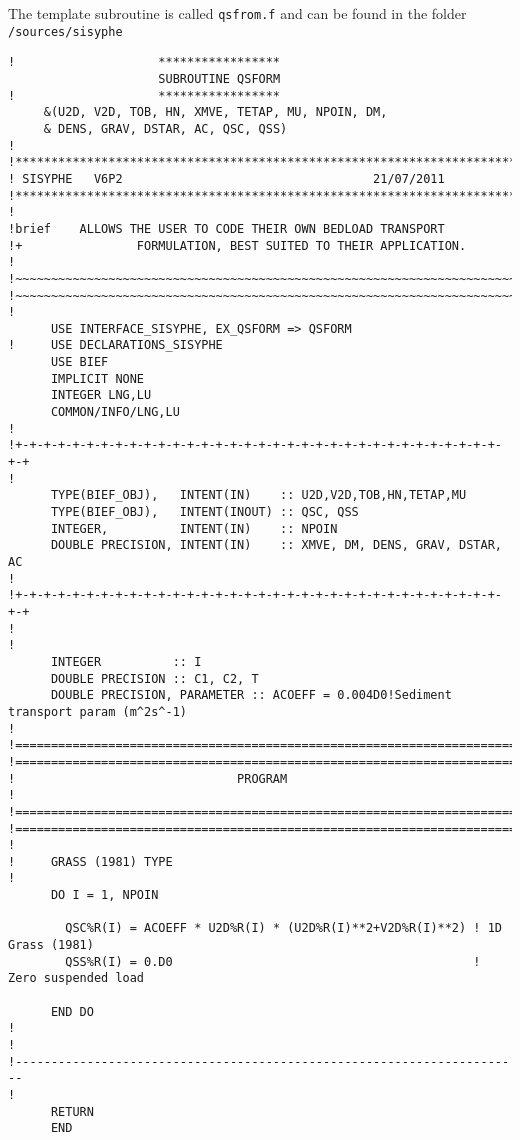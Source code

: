 The template subroutine is called \texttt{qsfrom.f} and can be found in the folder \texttt{/sources/sisyphe}
\begin{lstlisting}[frame=trBL]
!                    ***************** 
                     SUBROUTINE QSFORM 
!                    ***************** 
     &(U2D, V2D, TOB, HN, XMVE, TETAP, MU, NPOIN, DM,  
     & DENS, GRAV, DSTAR, AC, QSC, QSS) 
! 
!***********************************************************************
! SISYPHE   V6P2                                   21/07/2011 
!***********************************************************************
! 
!brief    ALLOWS THE USER TO CODE THEIR OWN BEDLOAD TRANSPORT 
!+                FORMULATION, BEST SUITED TO THEIR APPLICATION. 
! 
!~~~~~~~~~~~~~~~~~~~~~~~~~~~~~~~~~~~~~~~~~~~~~~~~~~~~~~~~~~~~~~~~~~~~~~~
!~~~~~~~~~~~~~~~~~~~~~~~~~~~~~~~~~~~~~~~~~~~~~~~~~~~~~~~~~~~~~~~~~~~~~~~
! 
      USE INTERFACE_SISYPHE, EX_QSFORM => QSFORM 
!     USE DECLARATIONS_SISYPHE 
      USE BIEF 
      IMPLICIT NONE 
      INTEGER LNG,LU 
      COMMON/INFO/LNG,LU 
! 
!+-+-+-+-+-+-+-+-+-+-+-+-+-+-+-+-+-+-+-+-+-+-+-+-+-+-+-+-+-+-+-+-+-+-+-+
! 
      TYPE(BIEF_OBJ),   INTENT(IN)    :: U2D,V2D,TOB,HN,TETAP,MU 
      TYPE(BIEF_OBJ),   INTENT(INOUT) :: QSC, QSS 
      INTEGER,          INTENT(IN)    :: NPOIN 
      DOUBLE PRECISION, INTENT(IN)    :: XMVE, DM, DENS, GRAV, DSTAR, AC
! 
!+-+-+-+-+-+-+-+-+-+-+-+-+-+-+-+-+-+-+-+-+-+-+-+-+-+-+-+-+-+-+-+-+-+-+-+
! 
! 
      INTEGER          :: I 
      DOUBLE PRECISION :: C1, C2, T 
      DOUBLE PRECISION, PARAMETER :: ACOEFF = 0.004D0!Sediment transport param (m^2s^-1)
! 
!======================================================================!
!======================================================================!
!                               PROGRAM                                !
!======================================================================!
!======================================================================!
! 
!     GRASS (1981) TYPE 
!      
      DO I = 1, NPOIN 
 
        QSC%R(I) = ACOEFF * U2D%R(I) * (U2D%R(I)**2+V2D%R(I)**2) ! 1D Grass (1981)  
        QSS%R(I) = 0.D0                                          ! Zero suspended load
 
      END DO 
! 
! 
!-----------------------------------------------------------------------
! 
      RETURN 
      END
\end{lstlisting}      

